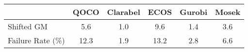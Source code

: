 \begin{tabular}{lccccc}
  \hline
   & \textbf{QOCO} & \textbf{Clarabel} & \textbf{ECOS} & \textbf{Gurobi} & \textbf{Mosek} \\ \hline
  Shifted GM & 5.6 & 1.0 & 9.6 & 1.4 & 3.6 \\ 
  Failure Rate (\%) & 12.3 & 1.9 & 13.2 & 2.8 & 6.6 \\ \hline 
\end{tabular}
